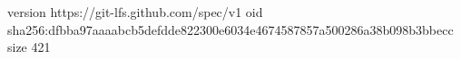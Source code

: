 version https://git-lfs.github.com/spec/v1
oid sha256:dfbba97aaaabcb5defdde822300e6034e4674587857a500286a38b098b3bbecc
size 421
